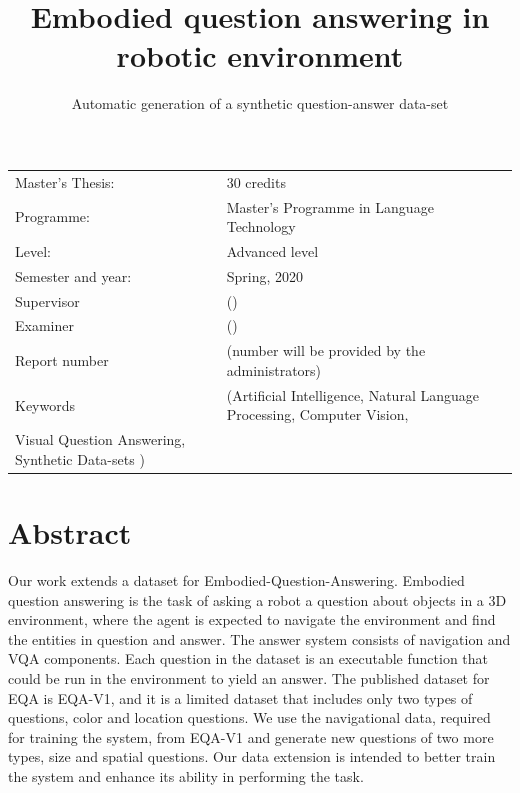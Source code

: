 \documentclass[11pt, a4paper]{article}
\title{Embodied question answering in\\ robotic environment}
\subtitle{Automatic generation of a synthetic question-answer data-set }
\author{}
\begin{document}
\begin{titlepage}

\maketitle

\vfill

\begingroup
\renewcommand*{\arraystretch}{1.2}
\begin{tabular}{l@{\hskip 20mm}l}
\hline
Master's Thesis: & 30 credits \\
Programme: & Master’s Programme in Language Technology\\
Level: & Advanced level \\
Semester and year: & Spring, 2020\\
Supervisor & ()\\
Examiner & ()\\
Report number & (number will be provided by the administrators) \\
Keywords & (Artificial Intelligence,  Natural Language Processing, Computer Vision,\\ Visual Question Answering, Synthetic Data-sets  ) 
\end{tabular}
\endgroup

\thispagestyle{empty}
\end{titlepage}

\newpage
\singlespacing
\section*{Abstract}
    Our work extends a dataset for Embodied-Question-Answering. Embodied question answering is the task of asking a robot a question about objects in a 3D environment, where the agent is expected to navigate the environment and find the entities in question and answer. The answer system consists of navigation and VQA components.  Each question in the dataset is an executable function that could be run in the environment to yield an answer.  The published dataset for EQA is EQA-V1, and it is a limited dataset that includes only two types of questions, color and location questions. We use the navigational data, required for training the system, from EQA-V1 and generate new questions of two more types, size and spatial questions. Our data extension is intended to better train the system and enhance its ability in performing the task. 
\end{document}
